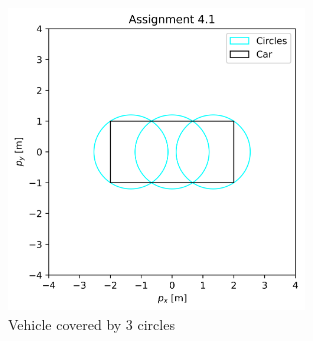 \documentclass[]{article}
\begin{document}
\begin{figure}[H]
    \centering
    \includegraphics[width=0.7\textwidth]{images/Assignment_41.png}
    \caption{Vehicle covered by 3 circles}
    \label{fig:assignment4_1}
\end{figure}
\end{document}
